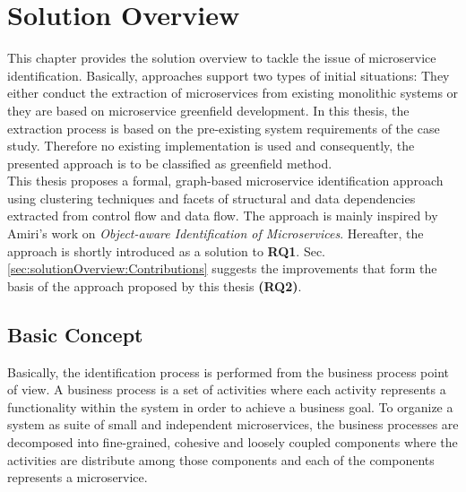 \chapter{Solution Overview}
\label{ch:Solution}
This chapter provides the solution overview to tackle the issue of microservice identification. Basically, approaches support two types of initial situations: They either conduct the extraction of microservices from existing monolithic systems or they are based on microservice greenfield development. In this thesis, the extraction process is based on the pre-existing system requirements of the case study. Therefore no existing implementation is used and consequently, the presented approach is to be classified as greenfield method.\\
This thesis proposes a formal, graph-based microservice identification approach using clustering techniques and facets of structural and data dependencies extracted from control flow and data flow. The approach is mainly inspired by Amiri's  work on \textit{Object-aware Identification of Microservices}. Hereafter, the approach \cite{ObjectAwareAmiri} is shortly introduced as a solution to \textbf{RQ1}. Sec.\ref{sec:solutionOverview:Contributions} suggests the improvements that form the basis of the approach proposed by this thesis \textbf{(RQ2)}.


\section{Basic Concept}
\label{sec:solutionOverview:basicConcept}
Basically, the identification process is performed from the business process point of view. A business process is a set of activities where each activity represents a functionality within the system in order to achieve a business goal. To organize a system as suite of small and independent microservices, the business processes are decomposed into fine-grained, cohesive and loosely coupled components where the activities are distribute among those components and each of the components represents a microservice.\\



